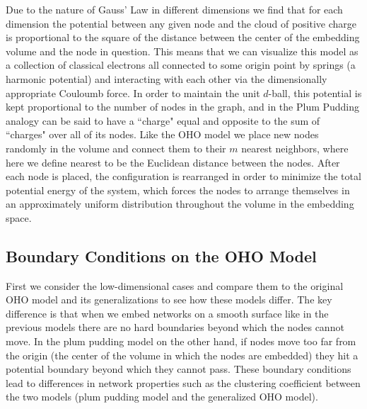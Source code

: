 \documentclass[aps,pre,reprint,superscriptaddress,amsmath,amssymb,nofootinbib]{revtex4-1}
\begin{document}
Due to the nature of Gauss' Law in different dimensions we find that for each dimension the potential between any given node and the cloud of positive charge is proportional to the square of the distance between the center of the embedding volume and the node in question.
This means that we can visualize this model as a collection of classical electrons all connected to some origin point by springs (a harmonic potential) and interacting with each other via the dimensionally appropriate Couloumb force.  
In order to maintain the unit $d$-ball, this potential is kept proportional to the number of nodes in the graph, and in the Plum Pudding analogy can be said to have a ``charge" equal and opposite to the sum of ``charges" over all of its nodes.
Like the OHO model we place new nodes randomly in the volume and connect them to their $m$ nearest neighbors, where here we define nearest to be the Euclidean distance between the nodes.
After each node is placed, the configuration is rearranged in order to minimize the total potential energy of the system, which forces the nodes to arrange themselves in an approximately uniform distribution throughout the volume in the embedding space.



\subsection{Boundary Conditions on the OHO Model}
First we consider the low-dimensional cases and compare them to the original OHO model and its generalizations to see how these models differ.
The key difference is that when we embed networks on a smooth surface like in the previous models there are no hard boundaries beyond which the nodes cannot move.
In the plum pudding model on the other hand, if nodes move too far from the origin (the center of the volume in which the nodes are embedded) they hit a potential boundary beyond which they cannot pass.
These boundary conditions lead to differences in network properties such as the clustering coefficient between the two models (plum pudding model and the generalized OHO model).
\end{document}
